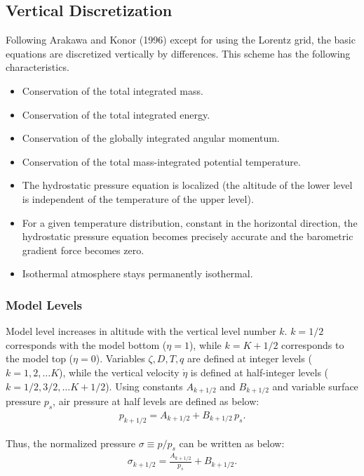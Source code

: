 \hypertarget{vertical-discretization}{%
\subsection{Vertical Discretization}\label{vertical-discretization}}

Following Arakawa and Konor (1996) except for using the Lorentz grid, the basic
equations are discretized vertically by differences. This scheme has the
following characteristics.

\begin{itemize}
\item
  Conservation of the total integrated mass.
\item
  Conservation of the total integrated energy.
\item
  Conservation of the globally integrated angular momentum.
\item
  Conservation of the total mass-integrated potential temperature.
\item
  The hydrostatic pressure equation is localized (the altitude of
  the lower level is independent of the temperature of the upper level).
\item
  For a given temperature distribution, constant in the horizontal
  direction, the hydrostatic pressure equation becomes precisely accurate and the
  barometric gradient force becomes zero.
\item
  Isothermal atmosphere stays permanently isothermal.
\end{itemize}

\hypertarget{model-levels}{%
\subsubsection{Model Levels}\label{model-levels}}

Model level increases in altitude with the vertical level number $k$. $k=1/2$ corresponds with the model bottom (\(\eta=1\)), while $k=K+1/2$ corresponds to the model top ($\eta=0$).
Variables $\zeta,D,T,q$ are defined at integer levels ($k=1,2,\ldots K$), while the vertical velocity $\dot{\eta}$ is defined at half-integer levels ($k=1/2,3/2,\ldots K+1/2$).
Using constants $A_{k+1/2}$ and $B_{k+1/2}$ and variable surface pressure $p_s$, air pressure at half levels are defined as below:
\begin{eqnarray}
p_{k+1/2} = A_{k+1/2} +B_{k+1/2}\,p_s.
\end{eqnarray}

Thus, the normalized pressure \(\sigma\equiv p/p_s\) can be written as below:
\begin{eqnarray}
\sigma_{k+1/2} = \frac{A_{k+1/2}}{p_s} +B_{k+1/2}.
\end{eqnarray}

